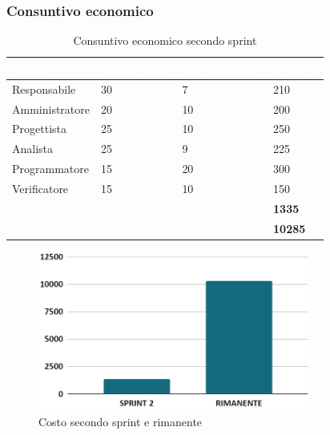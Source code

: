 \newpage
\subsubsection{Consuntivo economico}
{
\setlength{\tabcolsep}{10pt}
\renewcommand{\arraystretch}{1.5}
\begin{table}[h]
    \centering
    \begin{tabularx}{\textwidth}{| l | l | l | X |}
        \hline
        \rowcolor{headerrow} \textbf{\textcolor{white}{Ruolo}} & \textbf{\textcolor{white}{Costo orario}} & \textbf{\textcolor{white}{Ore impiegate}} & \textbf{\textcolor{white}{Costo €}} \\
        \hline
        Responsabile & 30 & 7 & 210\\
        \hline
        Amministratore & 20 & 10 & 200\\
        \hline
        Progettista& 25 & 10 & 250\\
        \hline
        Analista & 25 & 9 & 225\\
        \hline
        Programmatore & 15 & 20 & 300\\
        \hline
        Verificatore & 15 & 10 & 150\\
        \hline
        \cellcolor{headerrow} \textbf{\textcolor{white}{Totale}} &  &  & \textbf{1335}\\
        \hline
        \cellcolor{headerrow} \textbf{\textcolor{white}{Rimanente}} &  &  & \textbf{10285}\\
        \hline
    \end{tabularx}
    \caption{Consuntivo economico secondo sprint}
    \label{tab:consuntivocostisecondosprint}
\end{table}
}

\begin{figure}[h!]
    \centering
    \includegraphics[width=0.8\textwidth]{cons2costo.png}
    \caption{Costo secondo sprint e rimanente}
    \label{fig:consuntivocostosecondosprint}
\end{figure}

